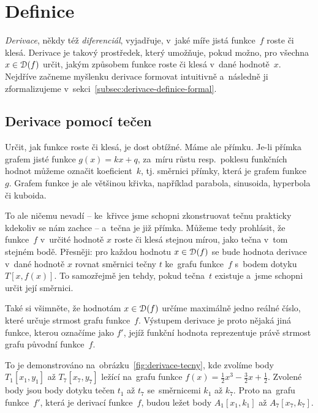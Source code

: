 \section{Definice}
\label{sec:derivace-definice}

\emph{Derivace}, někdy též \emph{diferenciál}, vyjadřuje, v~jaké míře jistá
funkce~$f$ roste či klesá. Derivace je takový prostředek, který umožňuje, pokud
možno, pro všechna ${x \in \mathcal{D}(f)}$ určit, jakým způsobem funkce roste či
klesá v~dané hodnotě~$x$. Nejdříve začneme myšlenku derivace formovat intuitivně
a~následně ji zformalizujeme v~sekci~\ref{subsec:derivace-definice-formal}.

\subsection{Derivace pomocí tečen}
\label{subsec:derivace-pomoci-tecen}

Určit, jak funkce roste či klesá, je dost obtížné. Máme ale přímku. Je-li přímka
grafem jisté funkce ${g(x) = kx + q}$, za~míru růstu resp.~poklesu funkčních hodnot
můžeme označit koeficient~$k$, tj. směrnici přímky, která je grafem funkce~$g$.
Grafem funkce je ale většinou křivka, například parabola, sinusoida, hyperbola či
kuboida.

To ale ničemu nevadí -- ke~křivce jsme schopni zkonstruovat tečnu prakticky kdekoliv
se nám zachce -- a~tečna je již přímka. Můžeme tedy prohlásit, že funkce~$f$ v~určité
hodnotě $x$ roste či klesá stejnou mírou, jako tečna v~tom stejném bodě. Přesněji:
pro každou hodnotu ${x \in \mathcal{D}(f)}$ se bude hodnota derivace v~dané hodnotě $x$
rovnat směrnici tečny $t$ ke~grafu funkce~$f$ s~bodem dotyku $T[x, f(x)]$. To
samozřejmě jen tehdy, pokud tečna~$t$ existuje a~jsme schopni určit její směrnici.

Také si všimněte, že hodnotám ${x \in \mathcal{D}(f)}$ určíme maximálně jedno reálné
číslo, které určuje strmost grafu funkce~$f$. Výstupem derivace je proto nějaká jiná
funkce, kterou označíme jako $f'$, jejíž funkční hodnota reprezentuje právě strmost
grafu původní funkce~$f$.

To je demonstrováno na~obrázku~\ref{fig:derivace-tecny}, kde zvolíme body $T_1[x_1, y_1]$ až
$T_7[x_7, y_7]$ ležící na~grafu funkce ${f(x) = \frac{1}{2} x^3 - \frac{3}{2} x +
\frac{1}{2}}$. Zvolené body jsou body dotyku tečen $t_1$ až $t_7$ se~směrnicemi $k_1$
až $k_7$. Proto na~grafu funkce~$f'$, která je derivací funkce~$f$, budou ležet body
$A_1[x_1, k_1]$ až $A_7[x_7, k_7]$.

